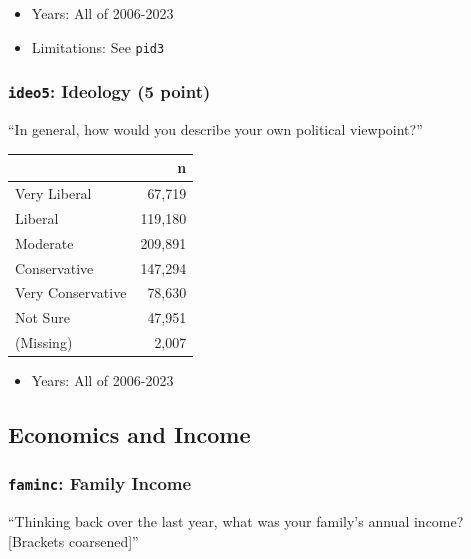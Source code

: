 \documentclass[10pt,article,oneside]{memoir}
\theoremstyle{definition}
\begin{document}
\begin{itemize}
\tightlist
\item
  Years: All of 2006-2023
\item
  Limitations: See \texttt{pid3}
\end{itemize}

\subsubsection{\texorpdfstring{\texttt{ideo5}: Ideology (5
point)}{ideo5: Ideology (5 point)}}\label{ideo5-ideology-5-point}

``In general, how would you describe your own political viewpoint?''

\begin{table}[H]
\centering
\begin{tabular}[t]{lr}
\toprule
 & n\\
\midrule
Very Liberal & 67,719\\
Liberal & 119,180\\
Moderate & 209,891\\
Conservative & 147,294\\
Very Conservative & 78,630\\
Not Sure & 47,951\\
(Missing) & 2,007\\
\bottomrule
\end{tabular}
\end{table}

\begin{itemize}
\tightlist
\item
  Years: All of 2006-2023
\end{itemize}

\subsection{Economics and Income}\label{economics-and-income}

\subsubsection{\texorpdfstring{\texttt{faminc}: Family
Income}{faminc: Family Income}}\label{faminc-family-income}

``Thinking back over the last year, what was your family's annual
income? {[}Brackets coarsened{]}''
\end{document}
